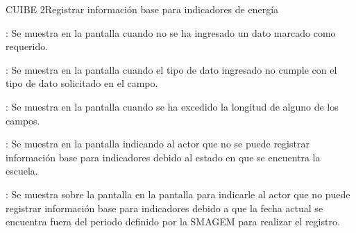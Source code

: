 \begin{UseCase}{CUIBE 2}{Registrar información base para indicadores de energía}
{\begin{UClist}
	    \UCli {}: Se muestra en la pantalla  cuando no se ha ingresado un dato marcado como requerido.
	    
	    \UCli {}: Se muestra en la pantalla  cuando el tipo de dato ingresado no cumple con el tipo de dato solicitado en el campo.
	    
	    \UCli {}: Se muestra en la pantalla  cuando se ha excedido la longitud de alguno de los campos.	    
	    
	    \UCli {}: Se muestra en la pantalla  indicando al actor que no se puede registrar información base para indicadores debido al estado en que se encuentra la escuela.
	    
	    \UCli {}: Se muestra sobre la pantalla en la pantalla  para indicarle al actor que no puede registrar información base para indicadores debido a que la fecha actual se encuentra fuera del periodo definido por la SMAGEM para realizar el registro.
	      
	\end{UClist}
    }


\end{UseCase}


